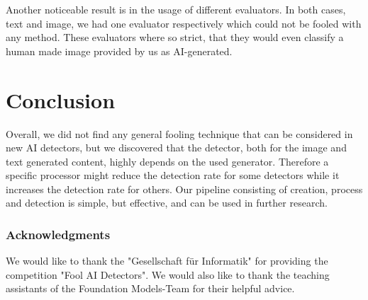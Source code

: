\documentclass{article} %
\begin{document}
Another noticeable result is in the usage of different evaluators. In both cases, text and image, we had one evaluator respectively which could not be fooled with any method. These evaluators where so strict, that they would even classify a human made image provided by us as AI-generated.

\section{Conclusion}
Overall, we did not find any general fooling technique that can be considered in new AI detectors, but we discovered that the detector, both for the image and text generated content, highly depends on the used generator. Therefore a specific processor might reduce the detection rate for some detectors while it increases the detection rate for others. Our pipeline consisting of creation, process and detection is simple, but effective, and can be used in further research.


\subsubsection*{Acknowledgments}
We would like to thank the "Gesellschaft für Informatik" for providing the competition "Fool AI Detectors". We would also like to thank the teaching assistants of the Foundation Models-Team for their helpful advice.



\end{document}
